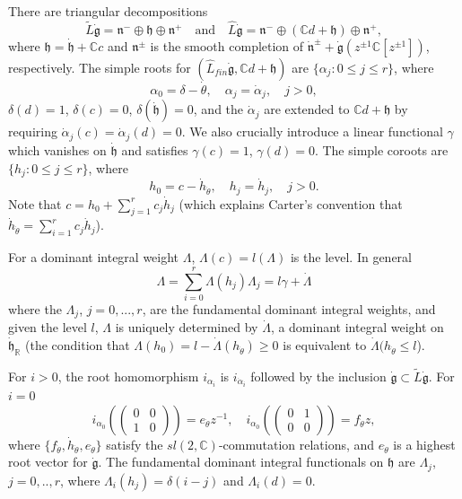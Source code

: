 \documentclass{amsart}
\theoremstyle{conjecture}
\theoremstyle{definition}
\theoremstyle{question}
\theoremstyle{questions}
\theoremstyle{remark}
\theoremstyle{remarks}
\theoremstyle{example}
\numberwithin{equation}{section}
\begin{document}
There are triangular decompositions
\begin{equation}\label{looptriangulardecomposition}\tilde L\dot{\mathfrak
g} =\mathfrak n^{-}\oplus \mathfrak h \oplus \mathfrak n^{ +}
\quad \text{and} \quad \widehat L\dot{\mathfrak g} =\mathfrak
n^{-}\oplus (\mathbb C d+\mathfrak h) \oplus \mathfrak n^{ +},
\end{equation} where $\mathfrak h=\dot {\mathfrak h}+\mathbb C c$
and $\mathfrak n^{\pm}$ is the smooth completion of
$\dot{\mathfrak n}^{\pm} +\dot{\mathfrak g}(z^{\pm 1}\mathbb
C[z^{\pm 1}])$, respectively. The simple roots for $(\widehat
L_{fin}\dot{\mathfrak g},\mathbb C d+\mathfrak h)$ are
$\{\alpha_j: 0\le j\le r\}$, where
\[\alpha_0=\delta-\dot{\theta} ,\quad\alpha_j=\dot{\alpha}_j,\quad j>0, \]
$\delta(d)=1$, $\delta(c)=0$, $\delta (\dot {\mathfrak h})=0$, and the
$\dot{\alpha}_j$ are extended to $\mathbb C d+\mathfrak h$ by
requiring $\dot{\alpha}_ j(c)=\dot{\alpha}_ j(d)=0$. We also
crucially introduce a linear functional $\gamma$ which vanishes on
$\dot{\mathfrak h}$ and satisfies $\gamma(c)=1$, $\gamma(d)=0$. The simple
coroots are $\{h_j:0\le j\le r\}$, where
\[h_0=c-\dot {h}_{\dot{\theta}},\quad h_j=\dot {h}_j,\quad j>0.\]
Note that $c=h_0+\sum_{j=1}^rc_j \dot h_j$ (which explains Carter's convention
that $\dot h_{\dot\theta}=\sum_{i=1}^rc_j\dot h_j$).

For a dominant integral weight $\Lambda$, $\Lambda(c)=l(\Lambda)$ is the level.
In general
\begin{equation}\label{domfunct}\Lambda=\sum_{i=0}^r\Lambda(h_j)\Lambda_j=l\gamma+\dot \Lambda\end{equation}
where the $\Lambda_j$, $j=0,...,r$, are the fundamental dominant integral weights,
and given the level $l$, $\Lambda$ is uniquely determined by $\dot \Lambda$, a dominant integral weight on $\dot{\mathfrak h}_{\mathbb R}$ (the condition that $\Lambda(h_0)=l-\dot\Lambda(h_{\dot\theta})\ge 0$ is
equivalent to $\dot\Lambda(h_{\dot\theta}\le l$).

For $i>0$, the root homomorphism $i_{\alpha_i}$ is
$i_{\dot{\alpha}_i}$ followed by the inclusion $\dot {\mathfrak
g}\subset \tilde L \dot{\mathfrak g}$. For $i=0$
\begin{equation}\label{roothom}i_{\alpha_0}(\left(\begin{matrix} 0&0\\
1&0\end{matrix} \right))=e_{\dot{\theta}}z^{-1},\quad
i_{\alpha_0}(\left(\begin{matrix}
0&1\\
0&0\end{matrix} \right))=f_{\dot{\theta}}z, \end{equation} where
$\{f_{\dot{\theta}},\dot {h}_{\dot{\theta}},e_{\dot{\theta}}\}$
satisfy the $ sl(2,\mathbb C )$-commutation relations, and
$e_{\dot{\theta}}$ is a highest root vector for $\dot {\mathfrak
g}$. The fundamental dominant integral functionals on $\mathfrak
h$ are $\Lambda_j$, $j=0,..,r$, where $\Lambda_i(h_j)=\delta(i-j)$
and $\Lambda_i(d)=0$.
\end{document}
